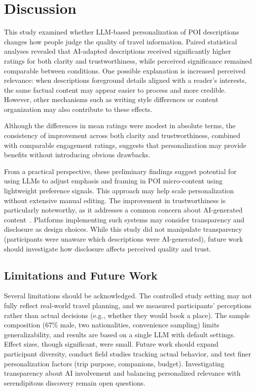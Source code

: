 \section{Discussion}
This study examined whether LLM-based personalization of POI descriptions changes how people judge the quality of travel information. Paired statistical analyses revealed that AI-adapted descriptions received significantly higher ratings for both clarity and trustworthiness, while perceived significance remained comparable between conditions. One possible explanation is increased perceived relevance: when descriptions foreground details aligned with a reader's interests, the same factual content may appear easier to process and more credible. However, other mechanisms such as writing style differences or content organization may also contribute to these effects.

Although the differences in mean ratings were modest in absolute terms, the consistency of improvement across both clarity and trustworthiness, combined with comparable engagement ratings, suggests that personalization may provide benefits without introducing obvious drawbacks.

From a practical perspective, these preliminary findings suggest potential for using LLMs to adjust emphasis and framing in POI micro-content using lightweight preference signals. This approach may help scale personalization without extensive manual editing. The improvement in trustworthiness is particularly noteworthy, as it addresses a common concern about AI-generated content~\cite{li_generative_2025}. Platforms implementing such systems may consider transparency and disclosure as design choices. While this study did not manipulate transparency (participants were unaware which descriptions were AI-generated), future work should investigate how disclosure affects perceived quality and trust.

\subsection{Limitations and Future Work}
Several limitations should be acknowledged. The controlled study setting may not fully reflect real-world travel planning, and we measured participants' perceptions rather than actual decisions (e.g., whether they would book a place). The sample composition (67\% male, two nationalities, convenience sampling) limits generalizability, and results are based on a single LLM with default settings. Effect sizes, though significant, were small. Future work should expand participant diversity, conduct field studies tracking actual behavior, and test finer personalization factors (trip purpose, companions, budget). Investigating transparency about AI involvement and balancing personalized relevance with serendipitous discovery remain open questions.
